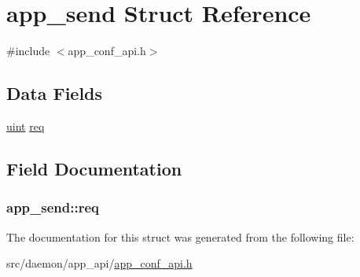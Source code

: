 \hypertarget{structapp__send}{}\section{app\+\_\+send Struct Reference}
\label{structapp__send}


{\ttfamily \#include $<$app\+\_\+conf\+\_\+api.\+h$>$}

\subsection*{Data Fields}
\begin{DoxyCompactItemize}
\item 
\hyperlink{generic_8h_a91ad9478d81a7aaf2593e8d9c3d06a14}{uint} \hyperlink{structapp__send_ad14353f49c4034012ec3385434fa28a2}{req}
\end{DoxyCompactItemize}


\subsection{Field Documentation}
\subsubsection[{\texorpdfstring{req}{req}}]{ app\+\_\+send\+::req}\hypertarget{structapp__send_ad14353f49c4034012ec3385434fa28a2}{}\label{structapp__send_ad14353f49c4034012ec3385434fa28a2}


The documentation for this struct was generated from the following file\+:\begin{DoxyCompactItemize}
\item 
src/daemon/app\+\_\+api/\hyperlink{app__conf__api_8h}{app\+\_\+conf\+\_\+api.\+h}\end{DoxyCompactItemize}
